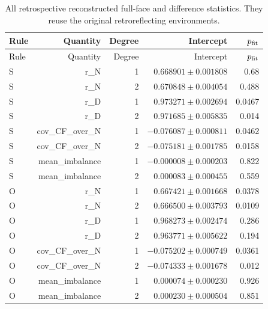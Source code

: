 {\small\setlength{\tabcolsep}{3.5pt}
\begin{longtable}{lrrrr}
\caption{All retrospective reconstructed full-face and difference statistics. They reuse the original retroreflecting environments.}\\
\toprule
Rule & Quantity & Degree & Intercept & $p_{\rm fit}$\\
\midrule
\endfirsthead
\toprule
Rule & Quantity & Degree & Intercept & $p_{\rm fit}$\\
\midrule
\endhead
\bottomrule\endfoot
S & r\_N & 1 & $0.668901\pm0.001808$ & 0.68\\
S & r\_N & 2 & $0.670848\pm0.004054$ & 0.488\\
S & r\_D & 1 & $0.973271\pm0.002694$ & 0.0467\\
S & r\_D & 2 & $0.971685\pm0.005835$ & 0.014\\
S & cov\_CF\_over\_N & 1 & $-0.076087\pm0.000811$ & 0.0462\\
S & cov\_CF\_over\_N & 2 & $-0.075181\pm0.001785$ & 0.0158\\
S & mean\_imbalance & 1 & $-0.000008\pm0.000203$ & 0.822\\
S & mean\_imbalance & 2 & $0.000083\pm0.000455$ & 0.559\\
O & r\_N & 1 & $0.667421\pm0.001668$ & 0.0378\\
O & r\_N & 2 & $0.666500\pm0.003793$ & 0.0109\\
O & r\_D & 1 & $0.968273\pm0.002474$ & 0.286\\
O & r\_D & 2 & $0.963771\pm0.005622$ & 0.194\\
O & cov\_CF\_over\_N & 1 & $-0.075202\pm0.000749$ & 0.0361\\
O & cov\_CF\_over\_N & 2 & $-0.074333\pm0.001678$ & 0.012\\
O & mean\_imbalance & 1 & $0.000074\pm0.000230$ & 0.926\\
O & mean\_imbalance & 2 & $0.000230\pm0.000504$ & 0.851\\
\end{longtable}}
